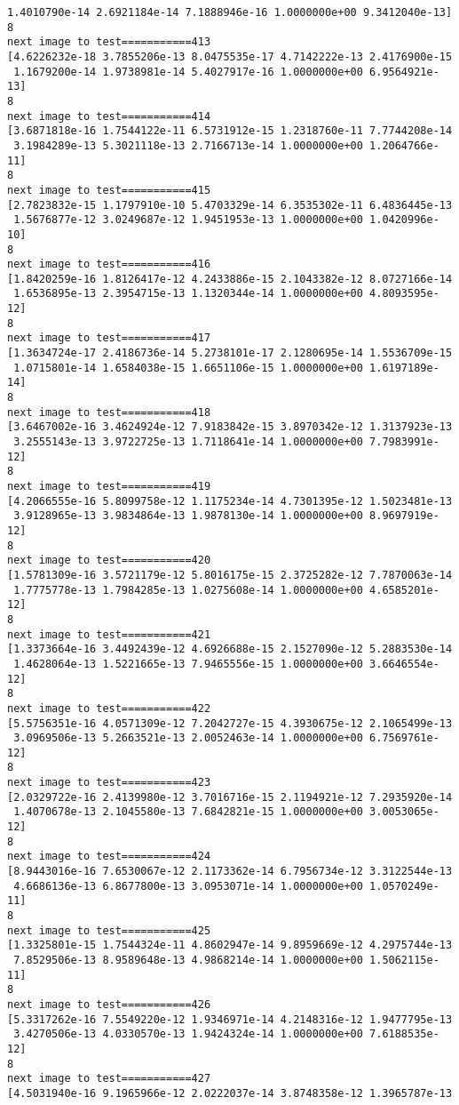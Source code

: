 \documentclass[11pt]{article}
\begin{document}
\begin{Verbatim}[commandchars=\\\{\}]
 1.4010790e-14 2.6921184e-14 7.1888946e-16 1.0000000e+00 9.3412040e-13]
8
next image to test===========413
[4.6226232e-18 3.7855206e-13 8.0475535e-17 4.7142222e-13 2.4176900e-15
 1.1679200e-14 1.9738981e-14 5.4027917e-16 1.0000000e+00 6.9564921e-13]
8
next image to test===========414
[3.6871818e-16 1.7544122e-11 6.5731912e-15 1.2318760e-11 7.7744208e-14
 3.1984289e-13 5.3021118e-13 2.7166713e-14 1.0000000e+00 1.2064766e-11]
8
next image to test===========415
[2.7823832e-15 1.1797910e-10 5.4703329e-14 6.3535302e-11 6.4836445e-13
 1.5676877e-12 3.0249687e-12 1.9451953e-13 1.0000000e+00 1.0420996e-10]
8
next image to test===========416
[1.8420259e-16 1.8126417e-12 4.2433886e-15 2.1043382e-12 8.0727166e-14
 1.6536895e-13 2.3954715e-13 1.1320344e-14 1.0000000e+00 4.8093595e-12]
8
next image to test===========417
[1.3634724e-17 2.4186736e-14 5.2738101e-17 2.1280695e-14 1.5536709e-15
 1.0715801e-14 1.6584038e-15 1.6651106e-15 1.0000000e+00 1.6197189e-14]
8
next image to test===========418
[3.6467002e-16 3.4624924e-12 7.9183842e-15 3.8970342e-12 1.3137923e-13
 3.2555143e-13 3.9722725e-13 1.7118641e-14 1.0000000e+00 7.7983991e-12]
8
next image to test===========419
[4.2066555e-16 5.8099758e-12 1.1175234e-14 4.7301395e-12 1.5023481e-13
 3.9128965e-13 3.9834864e-13 1.9878130e-14 1.0000000e+00 8.9697919e-12]
8
next image to test===========420
[1.5781309e-16 3.5721179e-12 5.8016175e-15 2.3725282e-12 7.7870063e-14
 1.7775778e-13 1.7984285e-13 1.0275608e-14 1.0000000e+00 4.6585201e-12]
8
next image to test===========421
[1.3373664e-16 3.4492439e-12 4.6926688e-15 2.1527090e-12 5.2883530e-14
 1.4628064e-13 1.5221665e-13 7.9465556e-15 1.0000000e+00 3.6646554e-12]
8
next image to test===========422
[5.5756351e-16 4.0571309e-12 7.2042727e-15 4.3930675e-12 2.1065499e-13
 3.0969506e-13 5.2663521e-13 2.0052463e-14 1.0000000e+00 6.7569761e-12]
8
next image to test===========423
[2.0329722e-16 2.4139980e-12 3.7016716e-15 2.1194921e-12 7.2935920e-14
 1.4070678e-13 2.1045580e-13 7.6842821e-15 1.0000000e+00 3.0053065e-12]
8
next image to test===========424
[8.9443016e-16 7.6530067e-12 2.1173362e-14 6.7956734e-12 3.3122544e-13
 4.6686136e-13 6.8677800e-13 3.0953071e-14 1.0000000e+00 1.0570249e-11]
8
next image to test===========425
[1.3325801e-15 1.7544324e-11 4.8602947e-14 9.8959669e-12 4.2975744e-13
 7.8529506e-13 8.9589648e-13 4.9868214e-14 1.0000000e+00 1.5062115e-11]
8
next image to test===========426
[5.3317262e-16 7.5549220e-12 1.9346971e-14 4.2148316e-12 1.9477795e-13
 3.4270506e-13 4.0330570e-13 1.9424324e-14 1.0000000e+00 7.6188535e-12]
8
next image to test===========427
[4.5031940e-16 9.1965966e-12 2.0222037e-14 3.8748358e-12 1.3965787e-13

\end{Verbatim}
\end{document}
